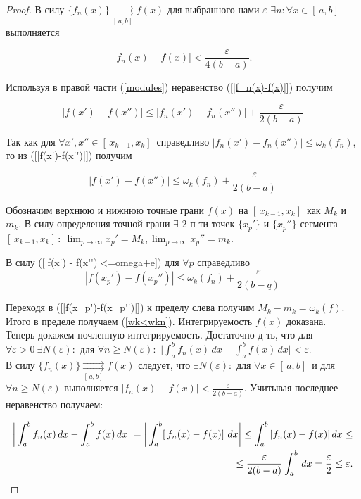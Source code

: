 \begin{proof}
В силу  $\{f_n(x)\} \underset{[\,a,b]\, }{\rightrightarrows}f(x)$ для выбранного нами $\varepsilon$ $\exists n: \forall x \in [\,a,b]\,$ выполняется

\begin{equation}\label{|f_n(x)-f(x)|}
    |f_n(x) - f(x)| < \frac{\varepsilon}{4(b-a)}.
\end{equation}

Используя в правой части (\ref{modules}) неравенство (\ref{|f_n(x)-f(x)|}) получим

\begin{equation}\label{|f(x')-f(x'')|}
    |f(x') - f(x'')| \le |f_n(x') - f_n(x'')| + \frac{\varepsilon}{2(b-a)}
\end{equation}

Так как для $\forall x',x'' \in [\,x_{k-1}, x_k]\,$ справедливо $|f_n(x')-f_n(x'')| \le \omega_k(f_n)$, то из (\ref{|f(x')-f(x'')|}) получим

\begin{equation}\label{|f(x') - f(x'')|<=omega+e}
    |f(x') - f(x'')| \le \omega_k(f_n) + \frac{\varepsilon}{2(b-a)}
\end{equation}

Обозначим верхнюю и нижнюю точные грани $f(x)$ на $[\,x_{k-1}, x_k]\,$ как $M_k$ и $m_k$. В силу определения точной грани $\exists$ 2 п-ти точек $\{x_p'\}$ и $\{x_p''\}$ сегмента $[\,x_{k-1}, x_k]\,: \ \lim_{p \rightarrow \infty}{x_p'} = M_k, \lim_{p \rightarrow \infty}{x_p''} = m_k$.

В силу (\ref{|f(x') - f(x'')|<=omega+e}) для $\forall p$ справедливо
\begin{equation}\label{|f(x_p')-f(x_p'')|}
    |f(x_p')-f(x_p'')| \le \omega_k(f_n) + \frac{\varepsilon}{2(b-q)}
\end{equation}

Переходя в (\ref{|f(x_p')-f(x_p'')|}) к пределу слева получим $M_k - m_k = \omega_k(f)$. Итого в пределе получаем (\ref{wk<wkn}). Интегрируемость $f(x)$ доказана. \\

Теперь докажем почленную интегрируемость. Достаточно д-ть, что для $\forall \varepsilon > 0 \ \exists N(\varepsilon):$ для $\forall n \ge N(\varepsilon):$ $\bigg|\int_{a}^{b} f_n(x) \,dx - \int_{a}^{b} f(x) \,dx\bigg| < \varepsilon$. \\

В силу $\{f_n(x)\} \underset{[\,a,b]\, }{\rightrightarrows}f(x)$ следует, что $\exists N(\varepsilon):$ для $\forall x \in [\,a,b]\,$ и для $\forall n \ge N(\varepsilon)$ выполняется $|f_n(x)-f(x)| < \frac{\varepsilon}{2(b-a)}$. Учитывая последнее неравенство получаем:

\begin{align}
    \bigg|\int_{a}^{b} f_n(x) \,dx - \int_{a}^{b} f(x) \,dx\bigg| = \bigg|\int_{a}^{b} [\, f_n(x) - f(x)]\,\,dx\bigg| \le \int_{a}^{b} |f_n(x) - f(x)|\,dx \le \notag \\ 
    \le \frac{\varepsilon}{2(b-a)}\int_{a}^{b}\,dx = \frac{\varepsilon}{2} \le \varepsilon.
\end{align}

\end{proof}

